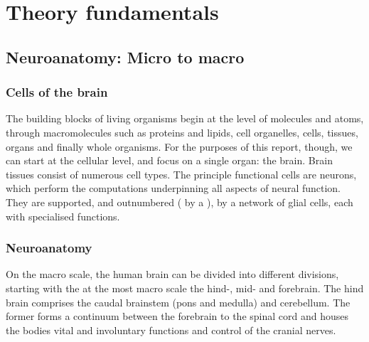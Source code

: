 \section{Theory fundamentals}
\label{theory}


\subsection{Neuroanatomy: Micro to macro}

\subsubsection{Cells of the brain}


The building blocks of living organisms begin at the level of molecules and atoms, through macromolecules such as proteins and lipids, cell organelles, cells, tissues, organs and finally whole organisms.
For the purposes of this report, though, we can start at the cellular level, and focus on a single organ: the brain.
Brain tissues consist of numerous cell types.
The principle functional cells are neurons, which perform the computations underpinning all aspects of neural function. They are supported, and outnumbered ( by a ), by a network of glial cells, each with specialised functions.

\subsubsection{Neuroanatomy}


On the macro scale, the human brain can be divided into  different divisions, starting with the at the most macro scale the hind-, mid- and forebrain.
The hind brain comprises the caudal brainstem (pons and medulla) and cerebellum.
The former forms a continuum between the forebrain to the spinal cord and houses the bodies vital and involuntary functions and control of the cranial nerves.

